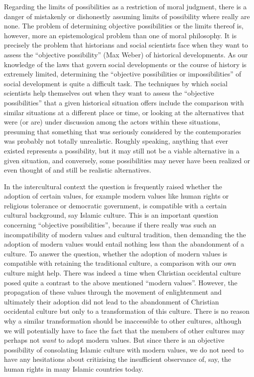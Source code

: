\documentclass[12pt,a4paper,ngerman]{article}
\begin{document}
Regarding the limits of possibilities as a restriction of moral
judgment, there is a danger of mistakenly or dishonestly assuming
limits of possibility where really are none. The problem of
determining objective possibilities or the limits thereof is, however,
more an epistemological problem than one of moral philosophy. It is
precisely the problem that historians and social scientists face when
they want to assess the ``objective possibility'' (Max Weber) of
historical developments. As our knowledge of the laws that govern
social developments or the course of history is extremely limited,
determining the ``objective possibilities or impossibilities'' of
social development is quite a difficult task. The techniques by which
social scientists help themselves out when they want to assess the
``objective possibilities'' that a given historical situation offers
include the comparison with similar situations at a different place or
time, or looking at the alternatives that were (or are) under
discussion among the actors within these situations, presuming that
something that was seriously considered by the contemporaries was
probably not totally unrealistic. Roughly speaking, anything that ever
existed represents a possibility, but it may still not be a viable
alternative in a given situation, and conversely, some possibilities
may never have been realized or even thought of and still be realistic
alternatives.

In the intercultural context the question is frequently raised whether
the adoption of certain values, for example modern values like human
rights or religious tolerance or democratic government, is compatible
with a certain cultural background, say Islamic culture. This is an
important question concerning ``objective possibilities'', because if
there really was such an incompatibility of modern values and cultural
tradition, then demanding the the adoption of modern values would
entail nothing less than the abandonment of a culture. To answer the
question, whether the adoption of modern values is compatible with
retaining the traditional culture, a comparison with our own culture
might help. There was indeed a time when Christian occidental culture
posed quite a contrast to the above mentioned ``modern values''.
However, the propagation of these values through the movement of
enlightenment and ultimately their adoption did not lead to the
abandonment of Christian occidental culture but only to a
transformation of this culture. There is no reason why a similar
transformation should be inaccessible to other cultures, although we
will potentially have to face the fact that the members of other cultures
may perhaps not {\em want} to adopt modern values. But since there is
an objective possibility of consolating Islamic culture with modern
values, we do not need to have any hesitations about critizising the
insufficient observance of, say, the human rights in many Islamic
countries today.
\end{document}
